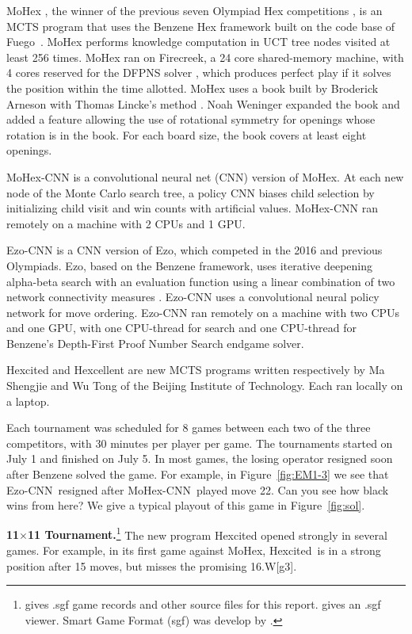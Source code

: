 \documentclass{icga}
\def\Eo{\mbox{\sc Ezo}}
\def\Ec{\mbox{\sc Ezo-CNN}}
\def\Hite{\mbox{\sc Hexcited}}
\def\Hent{\mbox{\sc Hexcellent}}
\def\Mx{\mbox{\sc MoHex}}
\def\Mc{\mbox{\sc MoHex-CNN}}
\def\Fuego{\mbox{\sc Fuego}}
\begin{document}
\Mx{} ,
the winner of the previous seven Olympiad Hex competitions ,
is an MCTS program that uses the Benzene Hex framework
built on the code base of \Fuego\ .
\Mx{} performs knowledge computation 
in UCT tree nodes visited at least 256 times.
\Mx{} ran on Firecreek, a 24 core shared-memory machine, 
with 4 cores reserved for the 
DFPNS solver , which
produces perfect play if it solves the
position within the time allotted.
\Mx{} uses a book built by Broderick Arneson with Thomas Lincke's method 
. 
Noah Weninger expanded the book and added a feature
allowing the use of rotational symmetry for openings
whose rotation is in the book.
For each board size, the book covers at least eight openings.

\Mc{} is a convolutional neural net (CNN) version of \Mx{}. 
At each new node of the Monte Carlo search tree, 
a policy CNN biases child selection by
initializing child visit and win counts with artificial values.
\Mc{} ran remotely on a machine with 2 CPUs and 1 GPU.

\Ec{} is a CNN version of \Eo{}, which competed
in the 2016 and previous Olympiads.
\Eo{}, based on the Benzene framework, 
uses iterative deepening alpha-beta search 
with an evaluation function using a linear combination of
two network connectivity measures .
\Ec{} uses a convolutional neural policy network
for move ordering.
\Ec{} ran remotely on a machine
with two CPUs and one GPU,
with one CPU-thread for search and one CPU-thread for
Benzene's Depth-First Proof Number Search endgame solver.

\Hite{} and \Hent{} are new MCTS programs written 
respectively by Ma Shengjie and Wu Tong
of the Beijing Institute of Technology.
Each ran locally on a laptop.

Each tournament was scheduled for 8 games between
each two of the three competitors, with 30 minutes per player per game.
The tournaments started on July 1 and finished on July 5.
In most games, the losing operator resigned
soon after Benzene solved the game.
For example, in Figure~\ref{fig:EM1-3} we see that
\Ec\ resigned after \Mc\ played move 22. Can you see how black wins from here?
We give a typical playout of this game in Figure~\ref{fig:sol}.

{\large\bf 11$\times$11 Tournament.}\footnote{
  gives .sgf game records and other source files for this report.
   gives an .sgf viewer. Smart Game Format (sgf)
  was develop by .}
The new program \Hite{} opened strongly in several games.
For example, in its first game against \Mx, \Hite\ is in a strong
position after 15 moves, but misses the promising 16.W[g3].
\end{document}
